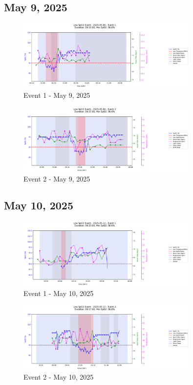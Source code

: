 \documentclass{article}
\begin{document}
\subsection{May 9, 2025}
\begin{figure}[htbp]
    \centering
    \includegraphics[width=0.8\textwidth]{images/2025-05-09_event_1.png}
    \caption{Event 1 - May 9, 2025}
\end{figure}
\begin{figure}[htbp]
    \centering
    \includegraphics[width=0.8\textwidth]{images/2025-05-09_event_2.png}
    \caption{Event 2 - May 9, 2025}
\end{figure}
\clearpage

\subsection{May 10, 2025}
\begin{figure}[htbp]
    \centering
    \includegraphics[width=0.8\textwidth]{images/2025-05-10_event_1.png}
    \caption{Event 1 - May 10, 2025}
\end{figure}
\begin{figure}[htbp]
    \centering
    \includegraphics[width=0.8\textwidth]{images/2025-05-10_event_2.png}
    \caption{Event 2 - May 10, 2025}
\end{figure}
\clearpage
\end{document}
